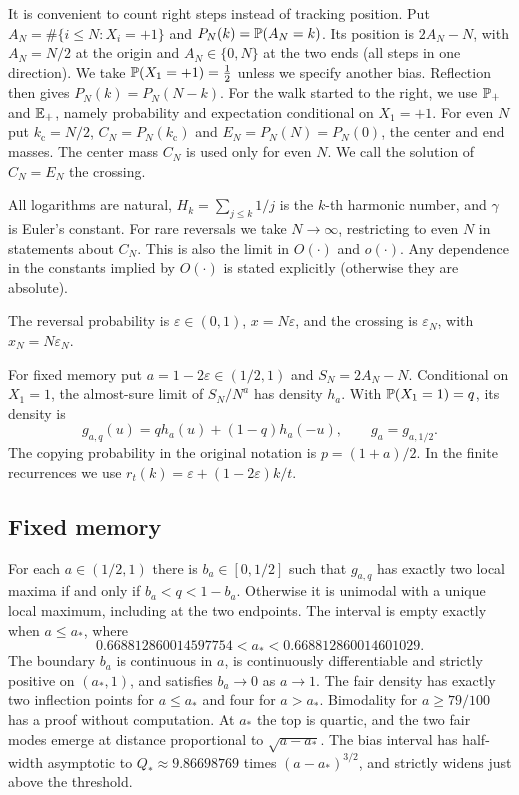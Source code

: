 It is convenient to count right steps instead of tracking position.
Put $A_N=\#\{i\le N:X_i=+1\}$ and $P_N(k)=\mathbb{P}(A_N=k)$.
Its position is $2A_N-N$, with $A_N=N/2$ at the origin and
$A_N\in\{0,N\}$ at the two ends (all steps in one direction).
We take $\mathbb{P}(X_1=+1)=\frac12$ unless we specify another bias.
Reflection then gives $P_N(k)=P_N(N-k)$.
For the walk started to the right, we use $\mathbb{P}_+$ and $\mathbb{E}_+$,
namely probability and expectation conditional on $X_1=+1$.
For even $N$ put ${k_{\mathrm c}}=N/2$, $C_N=P_N({k_{\mathrm c}})$ and $E_N=P_N(N)=P_N(0)$, the center
and end masses. The center mass $C_N$ is used only for even $N$. We call the solution of
$C_N=E_N$ the crossing.

All logarithms are natural,
$H_k=\sum_{j\le k}1/j$ is the $k$-th harmonic number, and $\gamma$ is Euler's
constant. For rare reversals we take $N\to\infty$, restricting to even
$N$ in statements about $C_N$. This is also the limit in $O(\cdot)$
and $o(\cdot)$. Any dependence in the constants implied by $O(\cdot)$
is stated explicitly (otherwise they are absolute).

The reversal probability is $\varepsilon\in(0,1)$, $x=N\varepsilon$, and
the crossing is $\varepsilon_N$, with $x_N=N\varepsilon_N$.


For fixed memory put $a=1-2\varepsilon\in(1/2,1)$ and
$S_N=2A_N-N$. Conditional on $X_1=1$, the almost-sure limit of
$S_N/N^a$ has density $h_a$. With $\mathbb{P}(X_1=1)=q$, its density is
\[
 g_{a,q}(u)=q h_a(u)+(1-q)h_a(-u),\qquad g_a=g_{a,1/2}.
\]
The copying probability in the original notation is $p=(1+a)/2$.
In the finite recurrences we use $r_t(k)=\varepsilon+(1-2\varepsilon)k/t$.

\subsection{Fixed memory}
\label{sec:results}

\begin{theorem}\label{thm:main-limit}
For each $a\in(1/2,1)$ there is $b_a\in[0,1/2]$ such that $g_{a,q}$
has exactly two local maxima if and only if $b_a<q<1-b_a$.
Otherwise it is unimodal with a unique local maximum, including at the
two endpoints. The interval is empty exactly when $a\le a_*$, where
\[
 0.668812860014597754<a_*<0.668812860014601029.
\]
The boundary $b_a$ is continuous in $a$, is continuously differentiable
and strictly positive on $(a_*,1)$, and satisfies $b_a\to0$ as $a\to1$.
The fair density has exactly two inflection points for $a\le a_*$
and four for $a>a_*$. Bimodality for $a\ge79/100$ has a proof
without computation. At $a_*$ the top is quartic, and the two fair
modes emerge at distance proportional to $\sqrt{a-a_*}$. The bias
interval has half-width asymptotic to $Q_*\approx9.86698769$ times
$(a-a_*)^{3/2}$, and strictly widens just above the threshold.
\end{theorem}

